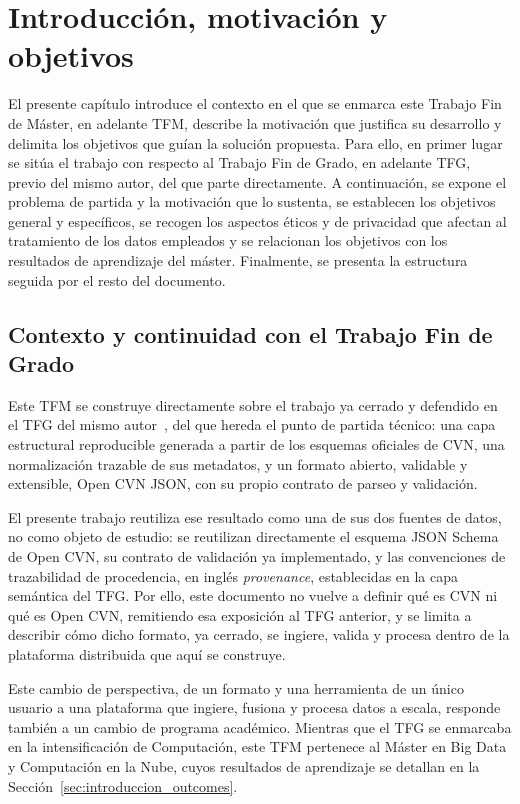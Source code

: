 \chapter{Introducción, motivación y objetivos}
\label{cap:introduccion}

El presente capítulo introduce el contexto en el que se enmarca este
Trabajo Fin de Máster, en adelante TFM, describe la motivación que
justifica su desarrollo y delimita los objetivos que guían la solución
propuesta. Para ello, en primer lugar se sitúa el trabajo con respecto al
Trabajo Fin de Grado, en adelante TFG, previo del mismo autor, del que
parte directamente. A continuación, se expone el problema de partida y la
motivación que lo sustenta, se establecen los objetivos general y
específicos, se recogen los aspectos éticos y de privacidad que afectan al
tratamiento de los datos empleados y se relacionan los objetivos con los
resultados de aprendizaje del máster. Finalmente, se presenta la
estructura seguida por el resto del documento.

\section{Contexto y continuidad con el Trabajo Fin de Grado}
\label{sec:introduccion_contexto}

Este TFM se construye directamente sobre el trabajo ya cerrado y defendido
en el TFG del mismo autor~\cite{tfg_open_cvn}, del que hereda el punto de
partida técnico: una capa estructural reproducible generada a partir de
los esquemas oficiales de CVN, una normalización trazable de sus
metadatos, y un formato abierto, validable y extensible, Open CVN JSON,
con su propio contrato de parseo y validación.

El presente trabajo reutiliza ese resultado como una de sus dos fuentes de
datos, no como objeto de estudio: se reutilizan directamente el esquema
JSON Schema de Open CVN, su contrato de validación ya implementado, y las
convenciones de trazabilidad de procedencia, en inglés
\textit{provenance}, establecidas en la capa semántica del TFG. Por ello,
este documento no vuelve a definir qué es CVN ni qué es Open CVN,
remitiendo esa exposición al TFG anterior, y se limita a describir cómo
dicho formato, ya cerrado, se ingiere, valida y procesa dentro de la
plataforma distribuida que aquí se construye.

Este cambio de perspectiva, de un formato y una herramienta de un único
usuario a una plataforma que ingiere, fusiona y procesa datos a escala,
responde también a un cambio de programa académico. Mientras que el TFG se
enmarcaba en la intensificación de Computación, este TFM pertenece al
Máster en Big Data y Computación en la Nube, cuyos resultados de
aprendizaje se detallan en la Sección~\ref{sec:introduccion_outcomes}.


